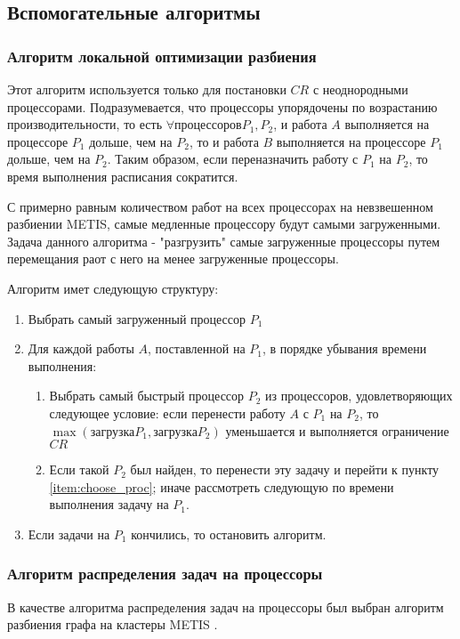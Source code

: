 \subsection{Вспомогательные алгоритмы}

\subsubsection{Алгоритм локальной оптимизации разбиения} \label{partition_optimization}

Этот алгоритм используется только для постановки $CR$ с неоднородными процессорами. Подразумевается, что процессоры упорядочены по возрастанию производительности, то есть $\forall \text{процессоров} P_1, P_2$, и работа $A$ выполняется на процессоре $P_1$ дольше, чем на $P_2$, то и работа $B$ выполняется на процессоре $P_1$ дольше, чем на $P_2$. Таким образом, если переназначить работу с $P_1$ на $P_2$, то время выполнения расписания сократится.

С примерно равным количеством работ на всех процессорах на невзвешенном разбиении METIS, самые медленные процессору будут самыми загруженными. Задача данного алгоритма - "разгрузить" самые загруженные процессоры путем перемещания раот с него на менее загруженные процессоры. 

Алгоритм имет следующую структуру:
\begin{enumerate}
    \item Выбрать самый загруженный процессор $P_1$
    \item Для каждой работы $A$, поставленной на $P_1$, в порядке убывания времени выполнения:
    \begin{enumerate}
        \item \label{item:choose_proc} Выбрать самый быстрый процессор $P_2$ из процессоров, удовлетворяющих следующее условие: если перенести работу $A$ с $P_1$ на $P_2$, то $\max(\text{загрузка} P_1, \text{загрузка} P_2)$ уменьшается и выполняется ограничение $CR$
        \item Если такой $P_2$ был найден, то перенести эту задачу и перейти к пункту \ref{item:choose_proc}; иначе рассмотреть следующую по времени выполнения задачу на $P_1$.
    \end{enumerate}
    \item Если задачи на $P_1$ кончились, то остановить алгоритм.
\end{enumerate}

\subsubsection{Алгоритм распределения задач на процессоры} \label{METIS}
В качестве алгоритма распределения задач на процессоры был выбран алгоритм разбиения графа на кластеры METIS \cite{Karypis2011}. 

